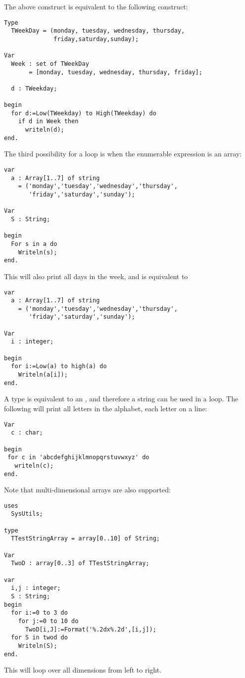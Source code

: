The above  construct is equivalent to the following
 construct:
\begin{verbatim}
Type
  TWeekDay = (monday, tuesday, wednesday, thursday,
              friday,saturday,sunday);

Var
  Week : set of TWeekDay
       = [monday, tuesday, wednesday, thursday, friday];

  d : TWeekday;

begin
  for d:=Low(TWeekday) to High(TWeekday) do
    if d in Week then
      writeln(d);
end.
\end{verbatim}

The third possibility for a  loop is when the enumerable expression
is an array:
\begin{verbatim}
var
  a : Array[1..7] of string
    = ('monday','tuesday','wednesday','thursday',
       'friday','saturday','sunday');

Var
  S : String;

begin
  For s in a do
    Writeln(s);
end.
\end{verbatim}
This will also print all days in the week, and is equivalent to
\begin{verbatim}
var
  a : Array[1..7] of string
    = ('monday','tuesday','wednesday','thursday',
       'friday','saturday','sunday');

Var
  i : integer;

begin
  for i:=Low(a) to high(a) do
    Writeln(a[i]);
end.
\end{verbatim}
A  type is equivalent to an , and therefore
a string can be used in a  loop. The following will
print all letters in the alphabet, each letter on a line:
\begin{verbatim}
Var
  c : char;

begin
 for c in 'abcdefghijklmnopqrstuvwxyz' do
   writeln(c);
end.
\end{verbatim}

Note that multi-dimensional arrays are also supported:
\begin{verbatim}
uses
  SysUtils;

type
  TTestStringArray = array[0..10] of String;

Var
  TwoD : array[0..3] of TTestStringArray;

var
  i,j : integer;
  S : String;
begin
  for i:=0 to 3 do
    for j:=0 to 10 do
      TwoD[i,J]:=Format('%.2dx%.2d',[i,j]);
  for S in twod do
    Writeln(S);
end.
\end{verbatim}
This will loop over all dimensions from left to right.

